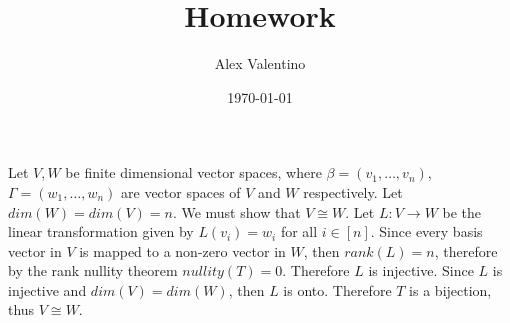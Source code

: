 \documentclass[12pt, letterpaper]{article}
\date{\today}
\author{Alex Valentino}
\title{Homework }
\begin{document}
	Let $V, W$ be finite dimensional vector spaces, where $\beta = (v_1,\ldots,v_n)$, $\Gamma = (w_1,\ldots,w_n)$ are vector spaces of $V$ and $W$ respectively. Let $dim(W) = dim(V) = n$. We must show that $V \cong W$.  Let $L : V \to W$ be the linear transformation given by $L(v_i) = w_i$ for all $i \in [n]$.  Since every basis vector in $V$ is mapped to a non-zero vector in $W$, then $rank(L) = n$, therefore by the rank nullity theorem $nullity(T) = 0$.  Therefore $L$ is injective.  Since $L$ is injective and $dim(V) = dim(W)$, then $L$ is onto.  Therefore $T$ is a bijection, thus $V \cong W$.  
\end{document}

